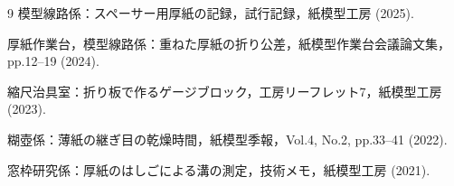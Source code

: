 \documentclass[submit]{ipsj}
\begin{document}
\begin{thebibliography}{9}
模型線路係：スペーサー用厚紙の記録，試行記録，紙模型工房 (2025).

厚紙作業台，模型線路係：重ねた厚紙の折り公差，紙模型作業台会議論文集，pp.12--19 (2024).

縮尺治具室：折り板で作るゲージブロック，工房リーフレット7，紙模型工房 (2023).

糊壺係：薄紙の継ぎ目の乾燥時間，紙模型季報，Vol.4, No.2, pp.33--41 (2022).

窓枠研究係：厚紙のはしごによる溝の測定，技術メモ，紙模型工房 (2021).

\end{thebibliography}
\end{document}
